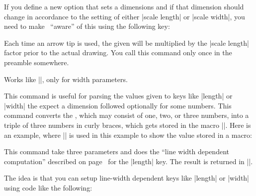 If you define a new option that sets a dimensions and if that
dimension should change in accordance to the setting of either
|scale length| or |scale width|, you need to make \pgfname\ ``aware''
of this using the following key:

\begin{command}{\pgfarrowsaddtolengthscalelist{}}
  Each time an arrow tip is used, the given 
  will be multiplied by the |scale length| factor prior to the actual
  drawing. You call this command only once in the preamble somewhere.
\end{command}

\begin{command}{\pgfarrowsaddtowidthscalelist{}}
  Works like |\pgfarrowsaddtolengthscalelist|, only for width parameters.
\end{command}


\begin{command}{\pgfarrowsthreeparameters{}}
  This command is useful for parsing the values given to keys like
  |length| or |width| the expect a dimension followed optionally for
  some numbers. This command converts the , which may consist of one, two, or three
  numbers, into a triple of three numbers in curly braces, which gets
  stored in the macro |\pgfarrowstheparameters|. Here is an example,
  where |\showvalueofmacro| is used in this example to show the value
  stored in a macro:
  \makeatletter
  \def\showvalueofmacro#1{%
    \texttt{\expandafter\expandafter\expandafter\expandafter\expandafter\expandafter\expandafter\pgfutil@gobble\expandafter\expandafter\expandafter\string\expandafter\csname#1\endcsname}
  }
\begin{codeexample}[]
\showvalueofmacro\pgfarrowstheparameters 
\end{codeexample}
\end{command}


\begin{command}{\pgfarrowslinewidthdependent{}}
  This command take three parameters and does the ``line width
  dependent computation'' described on page~\pageref{length-arrow-key} 
  for the |length| key. The result is returned in |\pgf@x|.

  The idea is that you can setup line-width dependent keys like
  |length| or |width| using code like the following:
\begin{codeexample}[code only]
\pgfkeys{/pgf/arrow keys/depth/.code={%
  \pgfarrowsthreeparameters{#1}%
  \expandafter\pgfarrowsaddtolateoptions\expandafter{%
    \expandafter\pgfarrowslinewidthdependent\pgfarrowstheparameters%
    \pgfarrowdepth\pgf@x%
  }%
}    
\end{codeexample}
\end{command}

